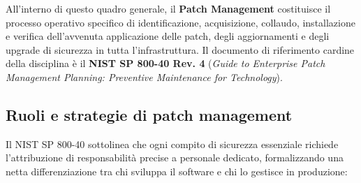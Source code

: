 \documentclass[../../main.tex]{subfiles}
\begin{document}
All'interno di questo quadro generale, il \textbf{Patch Management} costituisce il processo operativo specifico di identificazione, acquisizione, collaudo, installazione e verifica dell'avvenuta applicazione delle patch, degli aggiornamenti e degli upgrade di sicurezza in tutta l'infrastruttura. Il documento di riferimento cardine della disciplina è il \textbf{NIST SP 800-40 Rev. 4} (\textit{Guide to Enterprise Patch Management Planning: Preventive Maintenance for Technology}).

\subsection{Ruoli e strategie di patch management}
\label{subsec:ruoli_strategie_patch}

Il NIST SP 800-40 sottolinea che ogni compito di sicurezza essenziale richiede l'attribuzione di responsabilità precise a personale dedicato, formalizzando una netta differenziazione tra chi sviluppa il software e chi lo gestisce in produzione:
\end{document}
